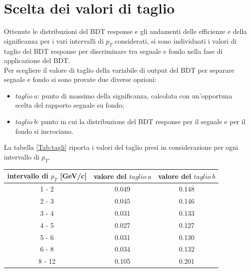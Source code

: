 



\section{Scelta dei valori di taglio}

Ottenute le distribuzioni del BDT response e gli andamenti delle efficienze e della significanza per i vari intervalli di $p_T$ considerati, si sono individuati i valori di taglio del BDT response per  discriminare tra segnale e fondo nella fase di applicazione del BDT. 
\\Per scegliere il valore di taglio della variabile di output del BDT per separare segnale e fondo si sono provate due diverse opzioni:
    \begin{itemize}
    \item $taglio \ a$: punto di massimo della significanza, calcolata con un'opportuna scelta del rapporto segnale su fondo;
    \item $taglio \ b$: punto in cui la distribuzione del BDT response per il segnale e per il fondo si incrociano. %
    \end{itemize}
La tabella \ref{Tab:tagli} riporta i valori del taglio presi in considerazione per ogni intervallo di $p_T$.

\begin{table}[H]
		\centering
		\begin{tabular}{c|c|c}
		    \toprule
		    intervallo di $p_T$ [GeV/c]  &  valore del $taglio \ a$ & valore del $taglio \ b$ \\
            \midrule
           	1 - 2  	&    0.049  &   0.148\\ 
            2 - 3 	&    0.045  &   0.146\\ 
            3 - 4  	&    0.031  &   0.133\\ 
            4 - 5  	&    0.027  &   0.127\\ 
            5 - 6  	&    0.031  &   0.130\\ 
            6 - 8  	&    0.034  &   0.132\\ 
            8 - 12  &    0.105  &   0.201\\   
			\bottomrule
		\end{tabular}
	\end{table}
	
